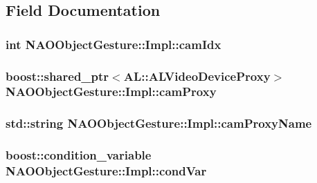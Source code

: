 \subsection{\-Field \-Documentation}
\hypertarget{structNAOObjectGesture_1_1Impl_aaf3eaa1152daea02503245eddea980d5}{
\subsubsection[{cam\-Idx}]{\setlength{\rightskip}{0pt plus 5cm}int {\bf \-N\-A\-O\-Object\-Gesture\-::\-Impl\-::cam\-Idx}}}\label{structNAOObjectGesture_1_1Impl_aaf3eaa1152daea02503245eddea980d5}
\hypertarget{structNAOObjectGesture_1_1Impl_a7f3333960dcdb8c5d2114dbf32a24c79}{
\subsubsection[{cam\-Proxy}]{\setlength{\rightskip}{0pt plus 5cm}boost\-::shared\-\_\-ptr$<$\-A\-L\-::\-A\-L\-Video\-Device\-Proxy$>$ {\bf \-N\-A\-O\-Object\-Gesture\-::\-Impl\-::cam\-Proxy}}}\label{structNAOObjectGesture_1_1Impl_a7f3333960dcdb8c5d2114dbf32a24c79}
\hypertarget{structNAOObjectGesture_1_1Impl_a4619593469888ecf2f468bba2373e66a}{
\subsubsection[{cam\-Proxy\-Name}]{\setlength{\rightskip}{0pt plus 5cm}std\-::string {\bf \-N\-A\-O\-Object\-Gesture\-::\-Impl\-::cam\-Proxy\-Name}}}\label{structNAOObjectGesture_1_1Impl_a4619593469888ecf2f468bba2373e66a}
\hypertarget{structNAOObjectGesture_1_1Impl_a0fb6f358c52e63cd517f19c47535be86}{
\subsubsection[{cond\-Var}]{\setlength{\rightskip}{0pt plus 5cm}boost\-::condition\-\_\-variable {\bf \-N\-A\-O\-Object\-Gesture\-::\-Impl\-::cond\-Var}}}\label{structNAOObjectGesture_1_1Impl_a0fb6f358c52e63cd517f19c47535be86}
